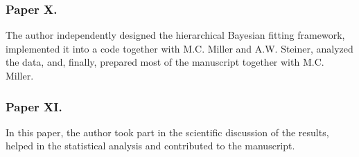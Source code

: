 \subsubsection*{Paper X.}
The author independently designed the hierarchical Bayesian fitting framework, implemented it into a code together with M.C. Miller and A.W. Steiner, analyzed the data, and, finally, prepared most of the manuscript together with M.C. Miller.


\subsubsection*{Paper XI.}
In this paper, the author took part in the scientific discussion of the results, helped in the statistical analysis and contributed to the manuscript.


